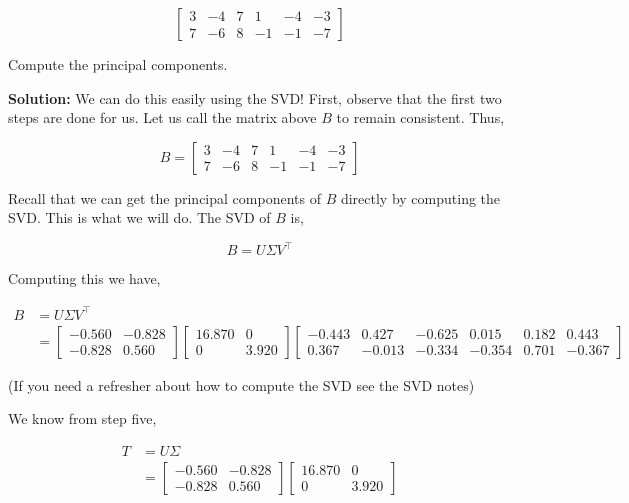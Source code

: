 \documentclass{article}
\begin{document}
$$\begin{bmatrix}
3& -4& 7& 1& -4& -3\\
7& -6& 8& -1& -1& -7
\end{bmatrix}$$

\noindent Compute the principal components.

\bigskip

\textbf{Solution:} We can do this easily using the SVD! First, observe that the first two steps are done for us. Let us call the matrix above $B$ to remain consistent. Thus,

$$B=\begin{bmatrix}
3&-4&7&1&-4&-3\\
7&-6&8&-1&-1&-7
\end{bmatrix}$$

Recall that we can get the principal components of $B$ directly by computing the SVD. This is what we will do. The SVD of $B$ is,

$$B=U\Sigma V^\top$$

Computing this we have,

\begin{align}
B&=U\Sigma V^\top\\
&=\begin{bmatrix}
-0.560&-0.828\\
-0.828&0.560\end{bmatrix}
\begin{bmatrix}
16.870&0\\
0&3.920
\end{bmatrix}
\begin{bmatrix}-0.443&0.427&-0.625&0.015&0.182&0.443\\
0.367&-0.013&-0.334&-0.354&0.701&-0.367\end{bmatrix}
\end{align}

(If you need a refresher about how to compute the SVD see the SVD notes)

We know from step five,

\begin{align}
T&=U\Sigma\\
&=\begin{bmatrix}
-0.560&-0.828\\
-0.828&0.560\end{bmatrix}
\begin{bmatrix}
16.870&0\\
0&3.920
\end{bmatrix}
\end{align}
\end{document}
